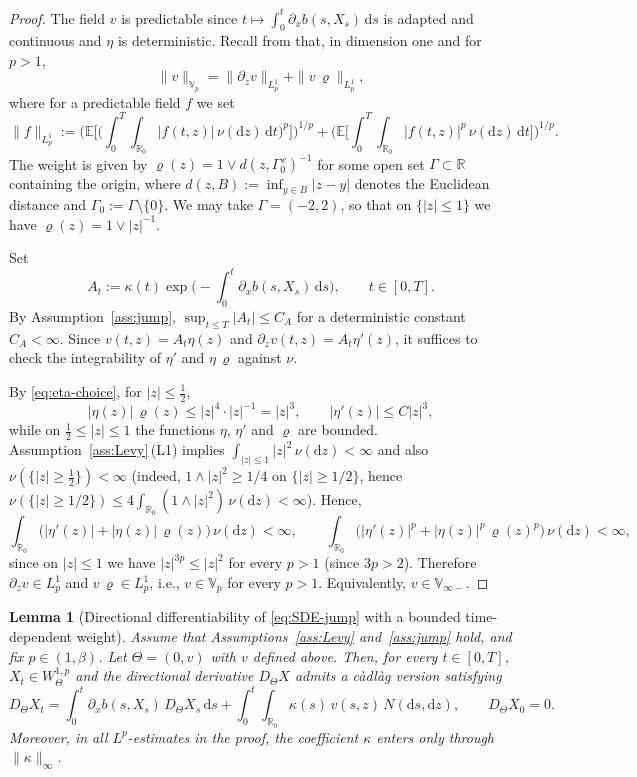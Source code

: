 \documentclass[11pt]{article}
\newcommand{\R}{\mathbb{R}}
\newcommand{\E}{\mathbb{E}}
\newcommand{\Vb}{\mathbb{V}}
\newcommand{\1}{\mathbf{1}}
\newcommand{\dd}{\mathrm{d}}
\theoremstyle{plain}
\newtheorem{lemma}[theorem]{Lemma}
\theoremstyle{definition}
\theoremstyle{remark}
\begin{document}
\begin{proof}
The field $v$ is predictable since $t\mapsto \int_0^t \partial_x b(s,X_s)\,\dd s$ is adapted and continuous and $\eta$ is deterministic.
Recall from \cite[Section~3]{NakagawaSuzuki2024} that, in dimension one and for $p>1$,
\[
\|v\|_{\Vb_p}=\|\partial_z v\|_{L_p^1}+\|v\,\varrho\|_{L_p^1},
\]
where for a predictable field $f$ we set
\[
\|f\|_{L_p^1}
:=\Big(\E\Big[\Big(\int_0^T\!\int_{\R_0} |f(t,z)|\,\nu(\dd z)\,\dd t\Big)^{p}\Big]\Big)^{1/p}
+\Big(\E\Big[\int_0^T\!\int_{\R_0} |f(t,z)|^p\,\nu(\dd z)\,\dd t\Big]\Big)^{1/p}.
\]
The weight is given by $\varrho(z)=1\vee d(z,\Gamma_0^{\,c})^{-1}$ for some open set $\Gamma\subset\R$ containing the origin,
where $d(z,B):=\inf_{y\in B}|z-y|$ denotes the Euclidean distance and $\Gamma_0:=\Gamma\setminus\{0\}$. We may take $\Gamma=(-2,2)$, so that on $\{|z|\le 1\}$ we have
$\varrho(z)=1\vee |z|^{-1}$.

Set
\[
A_t:=\kappa(t)\exp\Big(-\int_0^t \partial_x b(s,X_s)\,\dd s\Big),\qquad t\in[0,T].
\]
By Assumption~\ref{ass:jump}, $\sup_{t\le T}|A_t|\le C_A$ for a deterministic constant $C_A<\infty$.
Since $v(t,z)=A_t\eta(z)$ and $\partial_z v(t,z)=A_t\eta'(z)$, it suffices to check the integrability of
$\eta'$ and $\eta\,\varrho$ against $\nu$.

By \eqref{eq:eta-choice}, for $|z|\le \tfrac12$,
\[
|\eta(z)|\,\varrho(z)\le |z|^4\cdot |z|^{-1}=|z|^3,\qquad |\eta'(z)|\le C|z|^3,
\]
while on $\tfrac12\le |z|\le 1$ the functions $\eta$, $\eta'$ and $\varrho$ are bounded.
Assumption~\ref{ass:Levy}\,(L1) implies $\int_{|z|\le 1}|z|^2\,\nu(\dd z)<\infty$ and also $\nu(\{|z|\ge\tfrac12\})<\infty$ (indeed, $1\wedge |z|^2\ge 1/4$ on $\{|z|\ge 1/2\}$, hence $\nu(\{|z|\ge 1/2\})\le 4\int_{\R_0}(1\wedge |z|^2)\,\nu(\dd z)<\infty$).
Hence,
\[
\int_{\R_0}\big(|\eta'(z)|+|\eta(z)|\,\varrho(z)\big)\,\nu(\dd z)<\infty,
\qquad
\int_{\R_0}\big(|\eta'(z)|^p+|\eta(z)|^p\,\varrho(z)^p\big)\,\nu(\dd z)<\infty,
\]
since on $|z|\le 1$ we have $|z|^{3p}\le |z|^2$ for every $p>1$ (since $3p>2$).
Therefore $\partial_z v\in L_p^1$ and $v\,\varrho\in L_p^1$, i.e., $v\in \Vb_p$ for every $p>1$.
Equivalently, $v\in \Vb_{\infty-}$.
\end{proof}


\begin{lemma}[Directional differentiability of \eqref{eq:SDE-jump} with a bounded time-dependent weight]\label{lem:jump-differentiability}
Assume that Assumptions~\ref{ass:Levy} and~\ref{ass:jump} hold, and fix $p\in(1,\beta)$.
Let $\Theta=(0,v)$ with $v$ defined above.
Then, for every $t\in[0,T]$, $X_t\in W^{1,p}_\Theta$ and the directional derivative $D_\Theta X$ admits a c\`adl\`ag version satisfying
\begin{equation}\label{eq:DXjump-linear}
D_\Theta X_t
=\int_0^t \partial_x b(s,X_s)\,D_\Theta X_s\,\dd s
+\int_0^t\int_{\R_0}\kappa(s)\,v(s,z)\,N(\dd s,\dd z),\qquad D_\Theta X_0=0.
\end{equation}
Moreover, in all $L^p$-estimates in the proof, the coefficient $\kappa$ enters only through $\|\kappa\|_\infty$.
\end{lemma}
\end{document}
